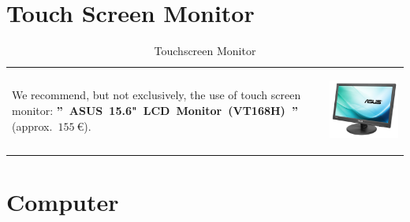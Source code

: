 \documentclass[12pt, a4paper]{article}
\newcommand{\money}[1]{$#1\ \euro{}$\xspace}
\begin{document}
\vspace{-0.5em}
\section{Touch Screen Monitor}
\vspace{-3.8em}

\begin{table}[!htbp]
\begin{tabular}{lr}
\parbox{25em}{
We recommend, but not exclusively,
the use of touch screen
monitor: \textbf{''~ASUS~15.6"~LCD~Monitor~(VT168H)~''} (approx.~\money{155}).
\vspace{-3em}
}

&

\parbox{17em}{
\begin{center}
\includegraphics[scale=0.14]{images/asus-15_6-lcd-monitor.png}
\caption*{Touchscreen Monitor}
\end{center}
}
\end{tabular}
\end{table}

\vspace{-1em}
\section{Computer}
\vspace{-3.71em}
\end{document}
